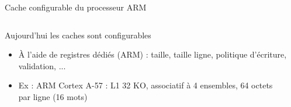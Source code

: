 %


\begin{Frame}{Cache configurable du processeur ARM}
  \begin{columns}[t]
    \begin{column}{.4\textwidth} %
      \begin{block}{Aujourd'hui les caches sont configurables}
        \begin{itemize}
        \item À l'aide de registres dédiés (ARM) : taille, taille ligne,
          politique d'écriture, validation, ...
        \item Ex : ARM Cortex A-57 : L1 32 KO, associatif à 4 ensembles,
          64 octets par ligne (16 mots)
        \end{itemize}
      \end{block}   
    \end{column}
    \begin{column}{.5\textwidth} %
      \begin{block}{}
      \end{block}
    \end{column}
  \end{columns}
\end{Frame}


